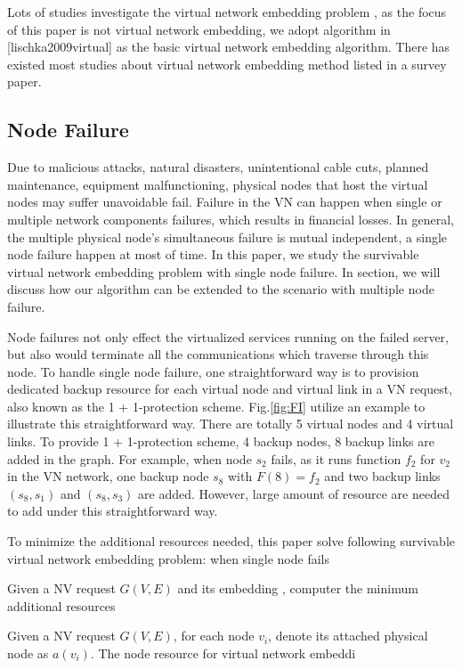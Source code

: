 Lots of studies investigate the virtual network embedding problem \cite{lischka2009virtual}, as the focus of this paper is not virtual network embedding, we adopt algorithm in [lischka2009virtual] as the basic virtual network embedding algorithm.
There has existed most studies about virtual network embedding method listed in a survey paper\cite{fischer2013virtual}.


\subsection{Node Failure}
Due to malicious attacks, natural disasters, unintentional cable cuts, planned maintenance, equipment malfunctioning, physical nodes that host the virtual nodes may suffer unavoidable fail. Failure in the VN can happen when single or multiple network components failures, which results in financial losses. In general, the multiple physical node's simultaneous failure is mutual independent, a single node failure happen at most of time\cite{yeow2011designing}. In this paper, we study the survivable virtual network embedding problem with single node failure. In section, we will discuss how our algorithm can be extended to the scenario with multiple node failure.


Node failures not only effect the virtualized services running on the failed server, but also would terminate all the communications which traverse through this node. To handle single node failure, one straightforward way  is to provision dedicated backup resource for each virtual node and virtual link in a VN request, also known as the 1 + 1-protection scheme. Fig.\ref{fig:FI} utilize an example to illustrate this straightforward way. There are totally 5 virtual nodes and 4 virtual links. To provide 1 + 1-protection scheme,  4 backup nodes, 8 backup links are added in the graph. For example, when node $s_2$ fails, as it runs function $f_2$ for $v_2$ in the VN network, one backup node $s_8$ with $F(8)=f_2$ and two backup links $(s_8, s_1)$ and $(s_8, s_3)$ are added. However, large amount of  resource are needed to add under this straightforward way.

To minimize the additional resources needed, this paper solve following survivable virtual network embedding problem: when single node fails

Given a NV request $G(V,E)$ and its embedding , computer the  minimum additional resources

Given a NV request $G(V,E)$, for each node $v_i$, denote its attached physical node as $a(v_i)$. The node resource for virtual network embeddi



